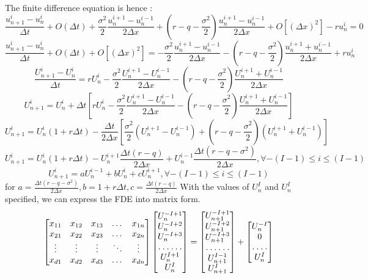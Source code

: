 The finite difference equation is hence : 
$$ \frac{u_{n+1}^{i} - u_{n}^{i}}{\Delta t} + O(\Delta t) + \frac{\sigma ^ {2}}{2}\frac{u_{n}^{i+1} - u_{n}^{i-1}}{2\Delta x} + (r - q - \frac{\sigma^{2}}{2})\frac{u_{n}^{i+1} - u_{n}^{i-1}}{2\Delta x} + O[(\Delta x)^{2}] -ru_{n}^{i} = 0$$
$$ \frac{u_{n+1}^{i} - u_{n}^{i}}{\Delta t} + O(\Delta t) + O[(\Delta x)^{2}] = -\frac{\sigma ^ {2}}{2}\frac{u_{n}^{i+1} - u_{n}^{i-1}}{2\Delta x} - (r - q - \frac{\sigma^{2}}{2})\frac{u_{n}^{i+1} + u_{n}^{i-1}}{2\Delta x} + ru_{n}^{i}$$
$$ \frac{U_{n+1}^{i} - U_{n}^{i}}{\Delta t} = rU_{n}^{i} - \frac{\sigma ^ {2}}{2}\frac{U_{n}^{i+1} - U_{n}^{i-1}}{2\Delta x} - (r - q - \frac{\sigma^{2}}{2})\frac{U_{n}^{i+1} + U_{n}^{i-1}}{2\Delta x}$$
$$ U_{n+1}^{i} = U_{n}^{i} + \Delta t[rU_{n}^{i} - \frac{\sigma ^ {2}}{2}\frac{U_{n}^{i+1} - U_{n}^{i-1}}{2\Delta x} - (r - q - \frac{\sigma^{2}}{2})\frac{U_{n}^{i+1} + U_{n}^{i-1}}{2\Delta x}]$$
$$ U_{n+1}^{i} = U_{n}^{i} (1+ r \Delta t) - \frac{\Delta t}{2\Delta x}[\frac{\sigma ^ {2}}{2}(U_{n}^{i+1} - U_{n}^{i-1}) + (r - q - \frac{\sigma^{2}}{2})(U_{n}^{i+1} + U_{n}^{i-1})]$$
$$ U_{n+1}^{i} = U_{n}^{i} (1+ r \Delta t) - U_{n}^{i+1}\frac{\Delta t(r-q)}{2\Delta x} + U_{n}^{i-1}\frac{\Delta t(r - q - \sigma^{2})}{2\Delta x}, \forall -(I-1) \le i \le (I-1)$$
$$ U_{n+1}^{i} = aU_{n}^{i-1}+ bU_{n}^{i} + cU_{n}^{i+1} , \forall -(I-1) \le i \le (I-1)$$
for $a = \frac{\Delta t(r - q - \sigma^{2})}{2\Delta x}, b = 1+ r \Delta t, c = \frac{\Delta t(r-q)}{2\Delta x}$
With the values of $U_{n}^{I}$ and $U_{n}^{I}$ specified, we can express the FDE into matrix form.
\[
\begin{bmatrix}
    x_{11} & x_{12} & x_{13} & \dots  & x_{1n} \\
    x_{21} & x_{22} & x_{23} & \dots  & x_{2n} \\
    \vdots & \vdots & \vdots & \ddots & \vdots \\
    x_{d1} & x_{d2} & x_{d3} & \dots  & x_{dn}
\end{bmatrix}
\begin{bmatrix}
    U_{n}^{-I+1}\\
    U_{n}^{-I+2}\\
    U_{n}^{-I+3}\\
    \hdotsfor{1} \\
    U_{n}^{I+1}\\
    U_{n}^{I}
\end{bmatrix}
=
\begin{bmatrix}
    U_{n+1}^{-I+1}\\
    U_{n+1}^{-I+2}\\
    U_{n+1}^{-I+3}\\
    \hdotsfor{1} \\
    U_{n+1}^{I-1}\\
    U_{n+1}^{I}
\end{bmatrix}
+
\begin{bmatrix}
    U_{n}^{-I}\\
    0\\
    \hdotsfor{1} \\
    U_{n}^{I}
\end{bmatrix}
\]

